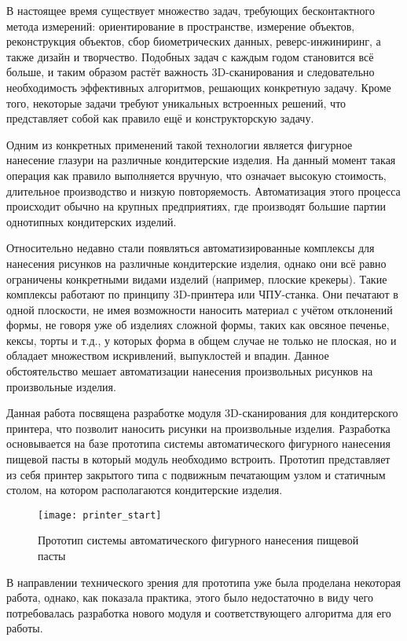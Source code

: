 \intro
В настоящее время существует множество задач, требующих бесконтактного метода измерений: ориентирование в пространстве, измерение объектов, реконструкция объектов, сбор биометрических данных, реверс-инжиниринг, а также дизайн и творчество. Подобных задач с каждым годом становится всё больше, и таким образом растёт важность 3D-сканирования и следовательно необходимость эффективных алгоритмов, решающих конкретную задачу. Кроме того, некоторые задачи требуют уникальных встроенных решений, что представляет собой как правило ещё и конструкторскую задачу.

Одним из конкретных применений такой технологии является фигурное нанесение глазури на различные кондитерские изделия. На данный момент такая операция как правило выполняется вручную, что означает высокую стоимость, длительное производство и низкую повторяемость. Автоматизация этого процесса происходит обычно на крупных предприятиях, где производят большие партии однотипных кондитерских изделий.

Относительно недавно стали появляться автоматизированные комплексы для нанесения рисунков на различные кондитерские изделия, однако они всё равно ограничены конкретными видами изделий (например, плоские крекеры). Такие комплексы работают по принципу 3D-принтера или ЧПУ-станка. Они печатают в одной плоскости, не имея возможности наносить материал с учётом отклонений формы, не говоря уже об изделиях сложной формы, таких как овсяное печенье, кексы, торты и т.д., у которых форма в общем случае не только не плоская, но и обладает множеством искривлений, выпуклостей и впадин. Данное обстоятельство мешает автоматизации нанесения произвольных рисунков на произвольные изделия.

Данная работа посвящена разработке модуля 3D-сканирования для кондитерского принтера, что позволит наносить рисунки на произвольные изделия. Разработка основывается на базе прототипа системы автоматического фигурного нанесения пищевой пасты в который модуль необходимо встроить. Прототип представляет из себя принтер закрытого типа с подвижным печатающим узлом и статичным столом, на котором располагаются кондитерские изделия.

\begin{figure}[!ht]\label{pic:printer_start}
    \centering
    \texttt{[image: printer\_start]}
    \caption{Прототип системы автоматического фигурного нанесения пищевой пасты}
\end{figure}

В направлении технического зрения для прототипа уже была проделана некоторая работа, однако, как показала практика, этого было недостаточно в виду чего потребовалась разработка нового модуля и соответствующего алгоритма для его работы.

